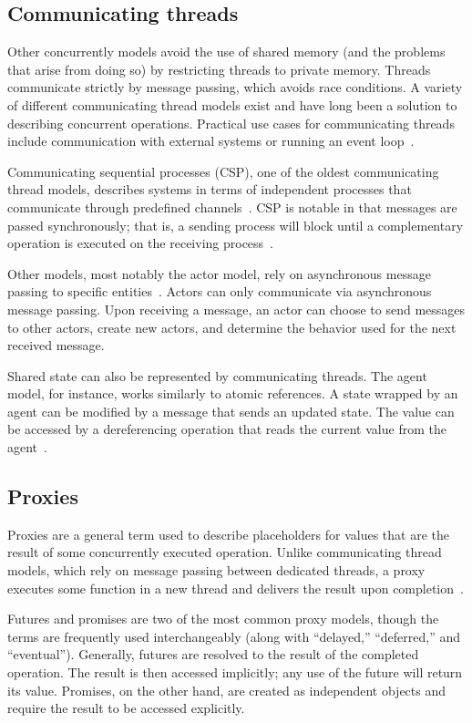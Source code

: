 \documentclass{sig-alternate}
\begin{document}
\subsection{Communicating threads}

Other concurrently models avoid the use of shared memory (and the problems that arise from doing so) by restricting threads to private memory. Threads communicate strictly by message passing, which avoids race conditions. A variety of different communicating thread models exist and have long been a solution to describing concurrent operations. Practical use cases for communicating threads include communication with external systems or running an event loop~\cite{Swalens2014}.

Communicating sequential processes (CSP), one of the oldest communicating thread models, describes systems in terms of independent processes that communicate through predefined channels~\cite{Hoare1978}. CSP is notable in that messages are passed synchronously; that is, a sending process will block until a complementary operation is executed on the receiving process~\cite{Swalens2014}.

Other models, most notably the actor model, rely on asynchronous message passing to specific entities~\cite{Agha1986}. Actors can only communicate via asynchronous message passing. Upon receiving a message, an actor can choose to send messages to other actors, create new actors, and determine the behavior used for the next received message.

Shared state can also be represented by communicating threads. The agent model, for instance, works similarly to atomic references. A state wrapped by an agent can be modified by a message that sends an updated state. The value can be accessed by a dereferencing operation that reads the current value from the agent~\cite{Swalens2014}.

\subsection{Proxies}

Proxies are a general term used to describe placeholders for values that are the result of some concurrently executed operation. Unlike communicating thread models, which rely on message passing between dedicated threads, a proxy executes some function in a new thread and delivers the result upon completion~\cite{Swalens2014}.

Futures and promises are two of the most common proxy models, though the terms are frequently used interchangeably (along with ``delayed,'' ``deferred,'' and ``eventual''). Generally, futures are resolved to the result of the completed operation. The result is then accessed implicitly; any use of the future will return its value. Promises, on the other hand, are created as independent objects and require the result to be accessed explicitly.
\end{document}
